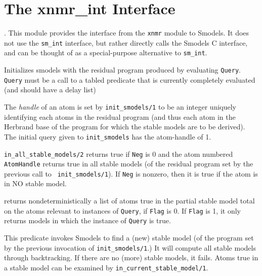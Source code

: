 \section{The xnmr\_int Interface}.
%
This module provides the interface from the {\tt xnmr} module to
Smodels.  It does not use the {\tt sm\_int} interface, but rather
directly calls the Smodels C interface, and can be thought of as a
special-purpose alternative to {\tt sm\_int}.
%
\begin{description}

%
Initializes smodels with the residual program produced by evaluating
{\tt Query}.  {\tt Query} must be a call to a tabled predicate that is
currently completely evaluated (and should have a delay list)


% 
The {\em handle} of an atom is set by {\tt init\_smodels/1} to be an
integer uniquely identifying each atoms in the residual program (and
thus each atom in the Herbrand base of the program for which the
stable models are to be derived).  The initial query given to
{\tt init\_smodels} has the atom-handle of 1.


%
{\tt in\_all\_stable\_models/2} returns true if {\tt Neg} is 0 and the
atom numbered {\tt AtomHandle} returns true in all stable models (of
the residual program set by the previous call to {\tt
  init\_smodels/1}).  If {\tt Neg} is nonzero, then it is true if the
atom is in NO stable model.


%
returns nondeterministically a list of atoms true in the partial
stable model total on the atoms relevant to instances of {\tt Query},
if {\tt Flag} is 0.  If {\tt Flag} is 1, it only returns models in
which the instance of {\tt Query} is true.


%
This predicate invokes Smodels to find a (new) stable model (of the
program set by the previous invocation of {\tt init\_smodels/1}.)  It
will compute all stable models through backtracking.  If there are no
(more) stable models, it fails.  Atoms true in a stable model can be
examined by {\tt in\_current\_stable\_model/1}.


\end{description}
